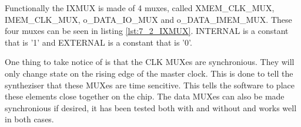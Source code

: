 Functionally the IXMUX is made of 4 muxes, called XMEM\_CLK\_MUX, IMEM\_CLK\_MUX, o\_DATA\_IO\_MUX and o\_DATA\_IMEM\_MUX. These four muxes can be seen in listing \ref{lst:7_2_IXMUX}. INTERNAL is a constant that is '1' and EXTERNAL is a constant that is '0'.



One thing to take notice of is that the CLK MUXes are synchronious. They will only change state on the rising edge of the  master clock. This is done to tell the syntheziser that these MUXes are time sencitive. This tells the software to place these elements close together on the chip. The data MUXes can also be made synchronious if desired, it has been tested both with and without and works well in both cases. 